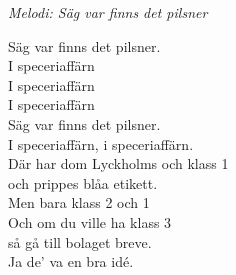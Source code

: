 {\footnotesize\textit{Melodi: Säg var finns det pilsner}}\par
\vspace{10pt}
Säg var finns det pilsner.\\
I speceriaffärn\\
I speceriaffärn\\
I speceriaffärn\\
Säg var finns det pilsner.\\
I speceriaffärn, i speceriaffärn.\\
Där har dom Lyckholms och klass 1\\
och prippes blåa etikett.\\
Men bara klass 2 och 1\\
Och om du ville ha klass 3\\
så gå till bolaget breve.\\
Ja de' va en bra idé.
